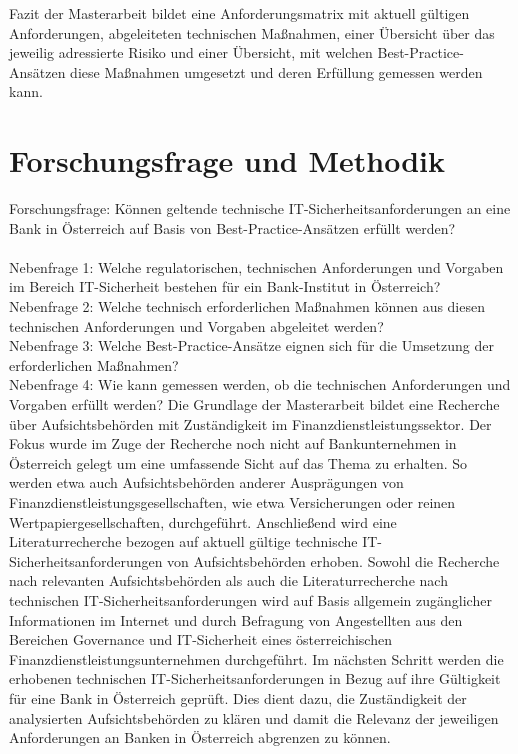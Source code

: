 \bigbreak
Fazit der Masterarbeit bildet eine Anforderungsmatrix mit aktuell gültigen Anforderungen, abgeleiteten technischen Maßnahmen, einer Übersicht über das jeweilig adressierte Risiko und einer Übersicht, mit welchen Best-Practice-Ansätzen diese Maßnahmen umgesetzt und deren Erfüllung gemessen werden kann.

\section{Forschungsfrage und Methodik}
\label{ch:Forschungsfrage}
Forschungsfrage: Können geltende technische IT-Sicherheitsanforderungen an eine Bank in Österreich auf Basis von Best-Practice-Ansätzen erfüllt werden?\\\\
Nebenfrage 1: Welche regulatorischen, technischen Anforderungen und Vorgaben im Bereich IT-Sicherheit bestehen für ein Bank-Institut in Österreich?\\
Nebenfrage 2: Welche technisch erforderlichen Maßnahmen können aus diesen technischen Anforderungen und Vorgaben abgeleitet werden?\\
Nebenfrage 3: Welche Best-Practice-Ansätze eignen sich für die Umsetzung der erforderlichen Maßnahmen?\\
Nebenfrage 4: Wie kann gemessen werden, ob die technischen Anforderungen und Vorgaben erfüllt werden?
\bigbreak
Die Grundlage der Masterarbeit bildet eine Recherche über Aufsichtsbehörden mit Zuständigkeit im Finanzdienstleistungssektor. Der Fokus wurde im Zuge der Recherche noch nicht auf Bankunternehmen in Österreich gelegt um eine umfassende Sicht auf das Thema zu erhalten. So werden etwa auch Aufsichtsbehörden anderer Ausprägungen von Finanzdienstleistungsgesellschaften, wie etwa Versicherungen oder reinen Wertpapiergesellschaften, durchgeführt. Anschließend wird eine Literaturrecherche bezogen auf aktuell gültige technische IT-Sicherheitsanforderungen von Aufsichtsbehörden erhoben. Sowohl die Recherche nach relevanten Aufsichtsbehörden als auch die Literaturrecherche nach technischen IT-Sicherheitsanforderungen wird auf Basis allgemein zugänglicher Informationen im Internet und durch Befragung von Angestellten aus den Bereichen Governance und IT-Sicherheit eines österreichischen Finanzdienstleistungsunternehmen durchgeführt.
Im nächsten Schritt werden die erhobenen technischen IT-Sicherheitsanforderungen in Bezug auf ihre Gültigkeit für eine Bank in Österreich geprüft. Dies dient dazu, die Zuständigkeit der analysierten Aufsichtsbehörden zu klären und damit die Relevanz der jeweiligen Anforderungen an Banken in Österreich abgrenzen zu können.
